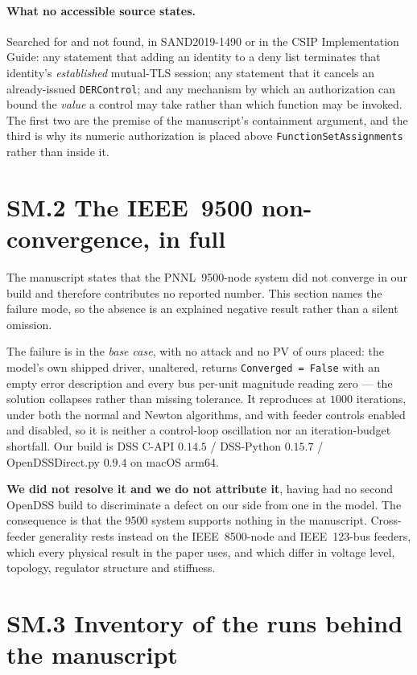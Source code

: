 \documentclass[review]{elsarticle}
\begin{document}
\paragraph{What no accessible source states.} Searched for and not found, in SAND2019-1490 or in
the CSIP Implementation Guide: any statement that adding an identity to a deny list terminates
that identity's \emph{established} mutual-TLS session; any statement that it cancels an
already-issued \texttt{DERControl}; and any mechanism by which an authorization can bound the
\emph{value} a control may take rather than which function may be invoked. The first two are the
premise of the manuscript's containment argument, and the third is why its numeric authorization
is placed above \texttt{FunctionSetAssignments} rather than inside it.

\section*{SM.2 The IEEE~9500 non-convergence, in full}

The manuscript states that the PNNL~9500-node system did not converge in our build and therefore
contributes no reported number. This section names the failure mode, so the absence is an
explained negative result rather than a silent omission.

The failure is in the \emph{base case}, with no attack and no PV of ours placed: the model's own
shipped driver, unaltered, returns \texttt{Converged = False} with an empty error description and
every bus per-unit magnitude reading zero --- the solution collapses rather than missing tolerance.
It reproduces at $1000$ iterations, under both the normal and Newton algorithms, and with feeder
controls enabled and disabled, so it is neither a control-loop oscillation nor an
iteration-budget shortfall. Our build is DSS C-API $0.14.5$ / DSS-Python $0.15.7$ /
OpenDSSDirect.py $0.9.4$ on macOS arm64.

\textbf{We did not resolve it and we do not attribute it}, having had no second OpenDSS build to
discriminate a defect on our side from one in the model. The consequence is that the 9500 system
supports nothing in the manuscript. Cross-feeder generality rests instead on the IEEE~8500-node
and IEEE~123-bus feeders, which every physical result in the paper uses, and which differ in
voltage level, topology, regulator structure and stiffness.

\section*{SM.3 Inventory of the runs behind the manuscript}
\end{document}
